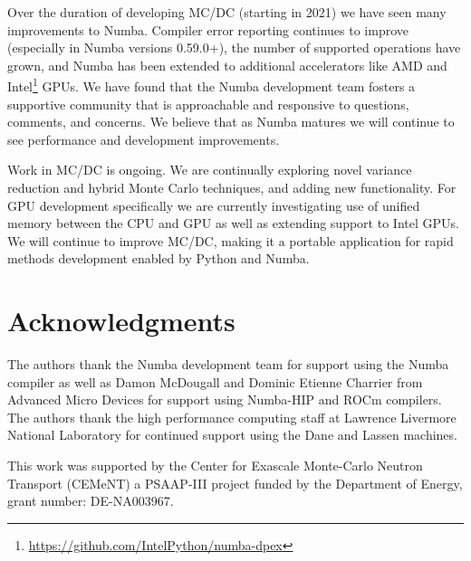 Over the duration of developing MC/DC (starting in 2021) we have seen many improvements to Numba.
Compiler error reporting continues to improve (especially in Numba versions 0.59.0$+$), the number of supported operations have grown, and Numba has been extended to additional accelerators like AMD and Intel\footnote{\url{https://github.com/IntelPython/numba-dpex}} GPUs.
We have found that the Numba development team fosters a supportive community that is approachable and responsive to questions, comments, and concerns.
We believe that as Numba matures we will continue to see performance and development improvements.

Work in MC/DC is ongoing.
We are continually exploring novel variance reduction and hybrid Monte Carlo techniques, and adding new functionality.
For GPU development specifically we are currently investigating use of unified memory between the CPU and GPU as well as extending support to Intel GPUs.
We will continue to improve MC/DC, making it a portable application for rapid methods development enabled by Python and Numba.

\section{Acknowledgments}
The authors thank the Numba development team for support using the Numba compiler as well as Damon McDougall and Dominic Etienne Charrier from Advanced Micro Devices for support using Numba-HIP and ROCm compilers.
The authors thank the high performance computing staff at Lawrence Livermore National Laboratory for continued support using the Dane and Lassen machines.

This work was supported by the Center for Exascale Monte-Carlo Neutron Transport (CEMeNT) a PSAAP-III project funded by the Department of Energy, grant number: DE-NA003967.